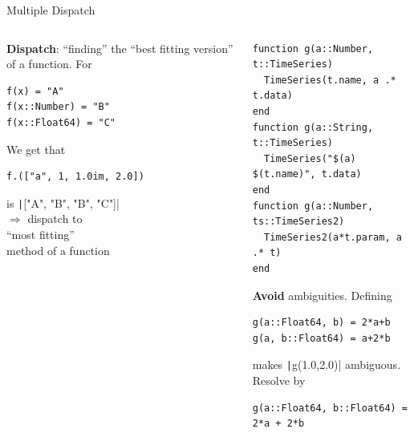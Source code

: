 \documentclass[aspectratio=169, 11pt, handout]{beamer}
\begin{document}
    \begin{frame}[fragile]{Multiple Dispatch}
        \begin{columns}[T]
            \begin{column}{.37\textwidth}
                \textbf{Dispatch}: “finding” the “best fitting version”
                of a function.
                \pause For
                \\
                \begin{verbatim}
f(x) = "A"
f(x::Number) = "B"
f(x::Float64) = "C"
                \end{verbatim}
                \pause
                \vspace{\baselineskip}
                We get that
                \begin{verbatim}
f.(["a", 1, 1.0im, 2.0])
                \end{verbatim}
                is \texttt|["A", "B", "B", "C"]|
                \pause
                \\[\baselineskip]
                $\Rightarrow$ dispatch to\\
                “most fitting”\\
                \alert{method} of a \alert{function}
            \end{column}
            \begin{column}{.62\textwidth}
                \vspace{-.25\baselineskip}
                \begin{verbatim}
function g(a::Number, t::TimeSeries)
  TimeSeries(t.name, a .* t.data)
end
function g(a::String, t::TimeSeries)
  TimeSeries("$(a) $(t.name)", t.data)
end
function g(a::Number, ts::TimeSeries2)
  TimeSeries2(a*t.param, a .* t)
end
                \end{verbatim}
                \pause
                \alert{\textbf{Avoid}} ambiguities. Defining
                \begin{verbatim}
g(a::Float64, b) = 2*a+b
g(a, b::Float64) = a+2*b
                \end{verbatim}
                makes \texttt|g(1.0,2.0)|
                \alert{ambiguous}.
                \pause Resolve by
                \begin{verbatim}
g(a::Float64, b::Float64) = 2*a + 2*b
                \end{verbatim}
            \end{column}
        \end{columns}
    \end{frame}
\end{document}
